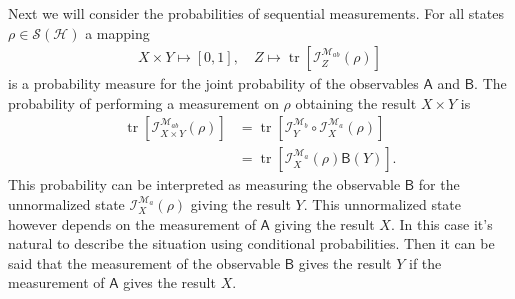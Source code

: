 \documentclass[a4paper,12pt]{wihuri}
\theoremstyle{definition}
\numberwithin{definition}{section}
\numberwithin{example}{section}
\numberwithin{theorem}{section}
\numberwithin{proposition}{section}
\numberwithin{lemma}{section}
\newcommand{\I}{\mathcal{I}}%
\newcommand{\hi}{\mathcal{H}}%
\newcommand{\tila}{\mathcal{S}}%
\newcommand{\mm}{\mathcal{M}}%
\newcommand{\A}{\mathsf{A}}%
\newcommand{\B}{\mathsf{B}}%
\DeclareMathOperator{\tr}{tr}
\begin{document}
Next we will consider the probabilities of sequential measurements. For all states $\rho \in \tila(\hi)$ a mapping
\begin{align*}
X \times Y \mapsto [0,1], \quad Z \mapsto \tr[\I_{Z}^{\mm_{ab}}(\rho)]
\end{align*}
is a probability measure for the joint probability of the observables $\A$ and $\B$. The probability of performing a measurement on $\rho$ obtaining the result $X \times Y$ is
\begin{align*}
\tr[\I_{X\times Y}^{\mm_{ab}}(\rho)] &= \tr[\I_Y^{\mm_b} \circ \I_X^{\mm_a}(\rho)] \\
&= \tr[\I_X^{\mm_a}(\rho)\B(Y)]\text{.}
\end{align*}
This probability can be interpreted as measuring the observable $\B$ for the unnormalized state $\I_X^{\mm_a}(\rho)$ giving the result $Y$. This unnormalized state however depends on the measurement of $\A$ giving the result $X$. In this case it's natural to describe the situation using conditional probabilities. Then it can be said that the measurement of the observable $\B$ gives the result $Y$ if the measurement of $\A$ gives the result $X$.
\end{document}

